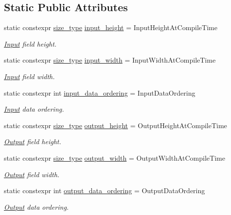 \subsection*{Static Public Attributes}
\begin{DoxyCompactItemize}
\item 
static constexpr \hyperlink{namespaceffnn_a63b90a2fd70eb76684eac482a51633e5}{size\-\_\-type} \hyperlink{structffnn_1_1layer_1_1hidden_1_1options_ac51716b775a79ff9f7855a146e8bf0c3}{input\-\_\-height} = Input\-Height\-At\-Compile\-Time
\begin{DoxyCompactList}\small\item\em \hyperlink{classffnn_1_1layer_1_1_input}{Input} field height. \end{DoxyCompactList}\item 
static constexpr \hyperlink{namespaceffnn_a63b90a2fd70eb76684eac482a51633e5}{size\-\_\-type} \hyperlink{structffnn_1_1layer_1_1hidden_1_1options_a4567b834d82f7f709d014809b34ec8c4}{input\-\_\-width} = Input\-Width\-At\-Compile\-Time
\begin{DoxyCompactList}\small\item\em \hyperlink{classffnn_1_1layer_1_1_input}{Input} field width. \end{DoxyCompactList}\item 
static constexpr int \hyperlink{structffnn_1_1layer_1_1hidden_1_1options_acc5fb3b7db8c64263825566a0b9d4d02}{input\-\_\-data\-\_\-ordering} = Input\-Data\-Ordering
\begin{DoxyCompactList}\small\item\em \hyperlink{classffnn_1_1layer_1_1_input}{Input} data ordering. \end{DoxyCompactList}\item 
static constexpr \hyperlink{namespaceffnn_a63b90a2fd70eb76684eac482a51633e5}{size\-\_\-type} \hyperlink{structffnn_1_1layer_1_1hidden_1_1options_a331b0dddbc72d13f8b490bef82fe3b16}{output\-\_\-height} = Output\-Height\-At\-Compile\-Time
\begin{DoxyCompactList}\small\item\em \hyperlink{classffnn_1_1layer_1_1_output}{Output} field height. \end{DoxyCompactList}\item 
static constexpr \hyperlink{namespaceffnn_a63b90a2fd70eb76684eac482a51633e5}{size\-\_\-type} \hyperlink{structffnn_1_1layer_1_1hidden_1_1options_a1f31ac8402dd47157ea7dd8eba82c017}{output\-\_\-width} = Output\-Width\-At\-Compile\-Time
\begin{DoxyCompactList}\small\item\em \hyperlink{classffnn_1_1layer_1_1_output}{Output} field width. \end{DoxyCompactList}\item 
static constexpr int \hyperlink{structffnn_1_1layer_1_1hidden_1_1options_aca708d2c3dd945b311c4a00bfeb1976c}{output\-\_\-data\-\_\-ordering} = Output\-Data\-Ordering
\begin{DoxyCompactList}\small\item\em \hyperlink{classffnn_1_1layer_1_1_output}{Output} data ordering. \end{DoxyCompactList}\end{DoxyCompactItemize}


